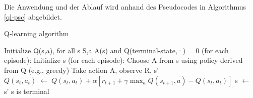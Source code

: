 Die Anwendung und der Ablauf wird anhand des Pseudocodes in Algorithmus \ref{ql-psc} abgebildet.

\begin{algorithm}
	\caption{Q-learning algorithm}
	\label{ql-psc}
	\begin{algorithmic}[1]
		\State Initialize Q(s,a), for all s \textepsilon S,a \textepsilon A(s) and Q(terminal-state,·) = 0
		\Repeat (for each episode):
		\State Initialize s
		\Repeat (for each episode):
		\State Choose A from s using policy derived from Q (e.g., greedy)
		\State Take action A, observe R, s'
		\State $Q(s_t,a_t)\;\leftarrow\;Q(s_t,a_t) + \alpha [ r_{t+1} + \gamma \max_a
		Q(s_{t+1},a) - Q(s_t,a_t) ]$
		\State s $\leftarrow $ s' 
		\Until s is terminal
	\end{algorithmic}
\end{algorithm}

